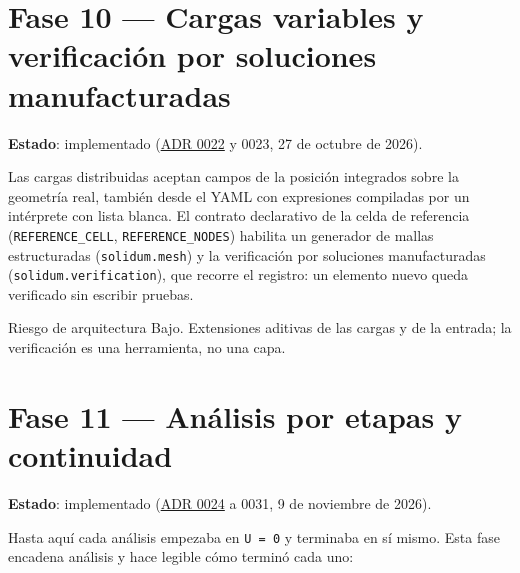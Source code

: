 \documentclass[11pt,oneside]{report}
\begin{document}
\section{Fase 10 --- Cargas variables y verificación por soluciones manufacturadas}

\textbf{Estado}: implementado (\hyperref[adr:0022]{ADR 0022} y 0023, 27 de octubre de 2026).

Las cargas distribuidas aceptan campos de la posición integrados sobre la geometría real, también desde el YAML con expresiones compiladas por un intérprete con lista blanca. El contrato declarativo de la celda de referencia (\texttt{REFERENCE\_CELL}, \texttt{REFERENCE\_NODES}) habilita un generador de mallas estructuradas (\texttt{solidum.mesh}) y la verificación por soluciones manufacturadas (\texttt{solidum.\allowbreak{}verification}), que recorre el registro: un elemento nuevo queda verificado sin escribir pruebas.

\begin{infobox}{Riesgo de arquitectura}
Bajo. Extensiones aditivas de las cargas y de la entrada; la verificación es una herramienta, no una capa.
\end{infobox}

\section{Fase 11 --- Análisis por etapas y continuidad}

\textbf{Estado}: implementado (\hyperref[adr:0024]{ADR 0024} a 0031, 9 de noviembre de 2026).

Hasta aquí cada análisis empezaba en \texttt{U = 0} y terminaba en sí mismo. Esta fase encadena análisis y hace legible cómo terminó cada uno:
\end{document}
